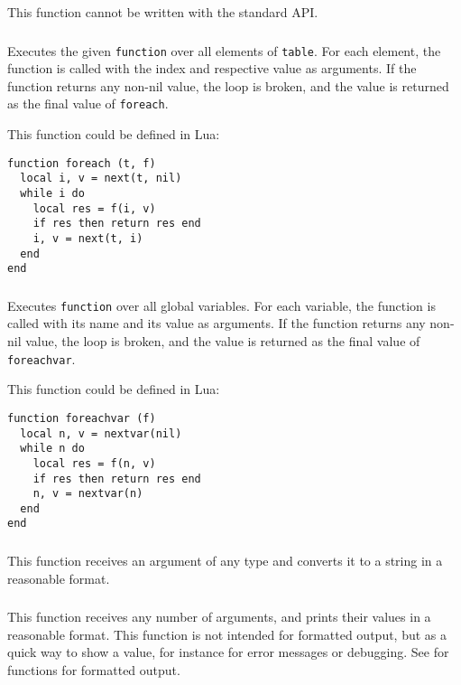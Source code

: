 This function cannot be written with the standard API.

\subsubsection*{\ff {}}
Executes the given \verb|function| over all elements of \verb|table|.
For each element, the function is called with the index and
respective value as arguments.
If the function returns any non-nil value,
the loop is broken, and the value is returned
as the final value of \verb|foreach|.

This function could be defined in Lua:
\begin{verbatim}
function foreach (t, f)
  local i, v = next(t, nil)
  while i do
    local res = f(i, v)
    if res then return res end
    i, v = next(t, i)
  end
end
\end{verbatim}

\subsubsection*{\ff {}}
Executes \verb|function| over all global variables.
For each variable,
the function is called with its name and its value as arguments.
If the function returns any non-nil value,
the loop is broken, and the value is returned
as the final value of \verb|foreachvar|.

This function could be defined in Lua:
\begin{verbatim}
function foreachvar (f)
  local n, v = nextvar(nil)
  while n do
    local res = f(n, v)
    if res then return res end
    n, v = nextvar(n)
  end
end
\end{verbatim}

\subsubsection*{\ff {}}
This function receives an argument of any type and
converts it to a string in a reasonable format.

\subsubsection*{\ff {}}
This function receives any number of arguments,
and prints their values in a reasonable format.
This function is not intended for formatted output,
but as a quick way to show a value,
for instance for error messages or debugging.
See  for functions for formatted output.


